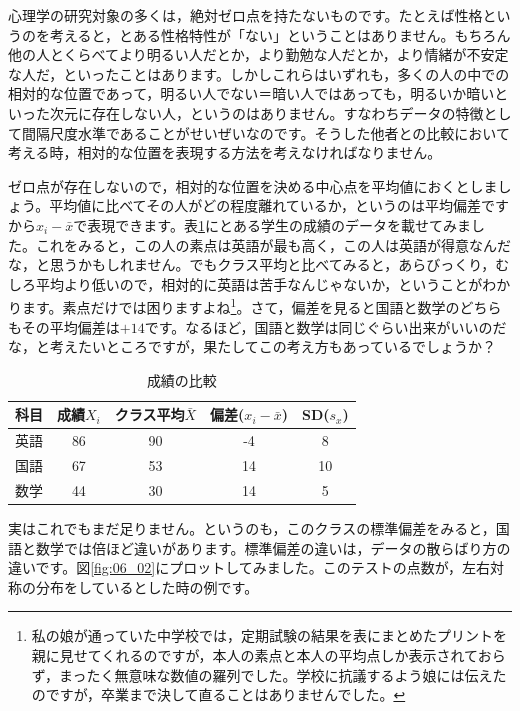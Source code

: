 \documentclass{ltjsbook}
\begin{document}
心理学の研究対象の多くは，絶対ゼロ点を持たないものです。たとえば性格というのを考えると，とある性格特性が「ない」ということはありません。もちろん他の人とくらべてより明るい人だとか，より勤勉な人だとか，より情緒が不安定な人だ，といったことはあります。しかしこれらはいずれも，多くの人の中での相対的な位置であって，明るい人でない＝暗い人ではあっても，明るいか暗いといった次元に存在しない人，というのはありません。すなわちデータの特徴として間隔尺度水準であることがせいぜいなのです。そうした他者との比較において考える時，相対的な位置を表現する方法を考えなければなりません。

ゼロ点が存在しないので，相対的な位置を決める中心点を平均値におくとしましょう。平均値に比べてその人がどの程度離れているか，というのは平均偏差ですから$x_i - \bar{x}$で表現できます。表\ref{tbl:06_05}にとある学生の成績のデータを載せてみました。これをみると，この人の素点は英語が最も高く，この人は英語が得意なんだな，と思うかもしれません。でもクラス平均と比べてみると，あらびっくり，むしろ平均より低いので，相対的に英語は苦手なんじゃないか，ということがわかります。素点だけでは困りますよね\footnote{私の娘が通っていた中学校では，定期試験の結果を表にまとめたプリントを親に見せてくれるのですが，本人の素点と本人の平均点しか表示されておらず，まったく無意味な数値の羅列でした。学校に抗議するよう娘には伝えたのですが，卒業まで決して直ることはありませんでした。}。さて，偏差を見ると国語と数学のどちらもその平均偏差は$+14$です。なるほど，国語と数学は同じぐらい出来がいいのだな，と考えたいところですが，果たしてこの考え方もあっているでしょうか？
\begin{table}[ht]
	\centering
	\caption{成績の比較}
	\begin{tabular}{ccccc}
		科目 & 成績$X_i$ & クラス平均$\bar{X}$ & 偏差($x_i - \bar{x}$) & SD($s_x$) \\\hline
		英語 & 86      & 90             & -4                  & 8         \\
		国語 & 67      & 53             & 14                  & 10        \\
		数学 & 44      & 30             & 14                  & 5         \\
	\end{tabular}
	\label{tbl:06_05}
\end{table}
実はこれでもまだ足りません。というのも，このクラスの標準偏差をみると，国語と数学では倍ほど違いがあります。標準偏差の違いは，データの散らばり方の違いです。図\ref{fig:06_02}にプロットしてみました。このテストの点数が，左右対称の分布をしているとした時の例です。
\end{document}
